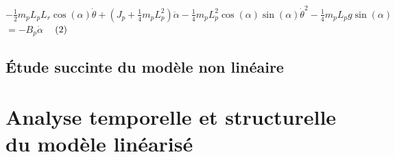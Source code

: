 \documentclass[12pt, a4paper, openany]{report}
\begin{document}
$-\frac{1}{2}m_{p}L_{p}L_{r}\cos(\alpha)\dot{\theta}+(J_{p}+\frac{1}{4}m_{p}L_{p}^{2})\ddot{\alpha}-\frac{1}{4}m_{p}L_{p}^{2}\cos(\alpha)\sin(\alpha)\dot{\theta}^{2}-\frac{1}{4}m_{p}L_{p}g\sin(\alpha)$\\$=-B_{p}\dot{\alpha}$   $\hspace{3mm}(2)$ \\
  

   


\section{Étude succinte du modèle non linéaire  }

                                                 













	
\chapter{Analyse temporelle et structurelle du modèle linéarisé }
\end{document}
